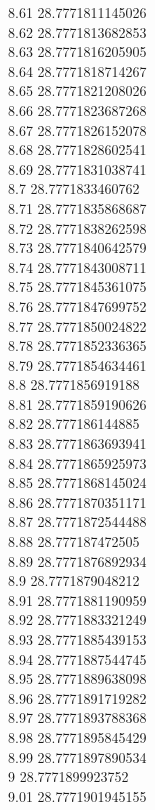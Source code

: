 {8.61	28.7771811145026\\
8.62	28.7771813682853\\
8.63	28.7771816205905\\
8.64	28.7771818714267\\
8.65	28.7771821208026\\
8.66	28.7771823687268\\
8.67	28.7771826152078\\
8.68	28.7771828602541\\
8.69	28.7771831038741\\
8.7	28.7771833460762\\
8.71	28.7771835868687\\
8.72	28.7771838262598\\
8.73	28.7771840642579\\
8.74	28.7771843008711\\
8.75	28.7771845361075\\
8.76	28.7771847699752\\
8.77	28.7771850024822\\
8.78	28.7771852336365\\
8.79	28.7771854634461\\
8.8	28.7771856919188\\
8.81	28.7771859190626\\
8.82	28.777186144885\\
8.83	28.7771863693941\\
8.84	28.7771865925973\\
8.85	28.7771868145024\\
8.86	28.7771870351171\\
8.87	28.7771872544488\\
8.88	28.777187472505\\
8.89	28.7771876892934\\
8.9	28.7771879048212\\
8.91	28.7771881190959\\
8.92	28.7771883321249\\
8.93	28.7771885439153\\
8.94	28.7771887544745\\
8.95	28.7771889638098\\
8.96	28.7771891719282\\
8.97	28.7771893788368\\
8.98	28.7771895845429\\
8.99	28.7771897890534\\
9	28.7771899923752\\
9.01	28.7771901945155\\
}
